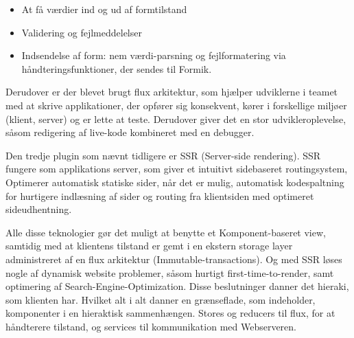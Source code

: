 \begin{itemize}
    \item At få værdier ind og ud af formtilstand
    \item  Validering og fejlmeddelelser
    \item  Indsendelse af form: nem værdi-parsning og fejlformatering via håndteringsfunktioner, der sendes til Formik.
\end{itemize}

Derudover er der blevet brugt flux arkitektur, som hjælper udviklerne i teamet med at skrive applikationer, der opfører sig konsekvent, kører i forskellige miljøer (klient, server) og er lette at teste. Derudover giver det en stor udvikleroplevelse, såsom redigering af live-kode kombineret med en debugger. 

Den tredje plugin som nævnt tidligere er SSR (Server-side rendering). SSR fungere som applikations server, som giver et intuitivt sidebaseret routingsystem, Optimerer automatisk statiske sider, når det er mulig, automatisk kodespaltning for hurtigere indlæsning af sider og routing fra klientsiden med optimeret sideudhentning. 

Alle disse teknologier gør det muligt at benytte et Komponent-baseret view, samtidig med at klientens tilstand er gemt i en ekstern storage layer administreret af en flux arkitektur (Immutable-transactions). Og med SSR løses nogle af dynamisk website problemer, såsom hurtigt first-time-to-render, samt optimering af Search-Engine-Optimization. Disse beslutninger danner det hieraki, som klienten har. Hvilket alt i alt danner en grænseflade, som indeholder, komponenter i en hieraktisk sammenhængen. Stores og reducers til flux, for at håndterere tilstand, og services til kommunikation med Webserveren. 

 



